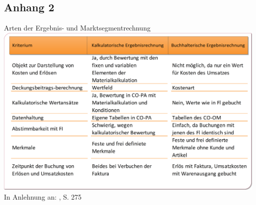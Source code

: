 \subsection{Anhang 2}
\label{sec:Anhang2}
\begin{table}[htbp]
\begin{center}
Arten der Ergebnis- und Marktsegmentrechnung
\includegraphics[width=1\textwidth]{Images/ergebnisrechnung.png}
{\footnotesize In Anlehnung an: \cite{Klein2010}, S. 275}
\end{center}
\end{table}